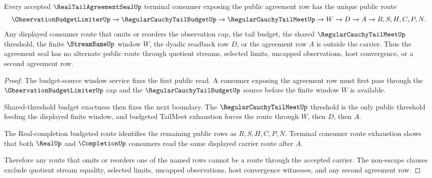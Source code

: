 \begin{theorem}
\label{thm:real-tail-agreement-seal-budget-route-uniqueness}
Every accepted $\RealTailAgreementSealUp$ terminal consumer exposing the public agreement row has the unique public route
$$
\ObservationBudgetLimiterUp \to \RegularCauchyTailBudgetUp \to \RegularCauchyTailMeetUp \to W \to D \to A \to R,S,H,C,P,N.
$$
Any displayed consumer route that omits or reorders the observation cap, the tail budget, the shared $\RegularCauchyTailMeetUp$ threshold, the finite $\StreamNameUp$ window $W$, the dyadic readback row $D$, or the agreement row $A$ is outside the carrier. Thus the agreement seal has no alternate public route through quotient streams, selected limits, uncapped observations, host convergence, or a second agreement row.
\end{theorem}
\begin{proof}
The budget-source window service fixes the first public read. A consumer exposing the agreement row must first pass through the $\ObservationBudgetLimiterUp$ cap and the $\RegularCauchyTailBudgetUp$ source before the finite window $W$ is available.

Shared-threshold budget exactness then fixes the next boundary. The $\RegularCauchyTailMeetUp$ threshold is the only public threshold feeding the displayed finite window, and budgeted TailMeet exhaustion forces the route through $W$, then $D$, then $A$.

The Real-completion budgeted route identifies the remaining public rows as $R,S,H,C,P,N$. Terminal consumer route exhaustion shows that both $\RealUp$ and $\CompletionUp$ consumers read the same displayed carrier route after $A$.

Therefore any route that omits or reorders one of the named rows cannot be a route through the accepted carrier. The non-escape clauses exclude quotient stream equality, selected limits, uncapped observations, host convergence witnesses, and any second agreement row.
\end{proof}

